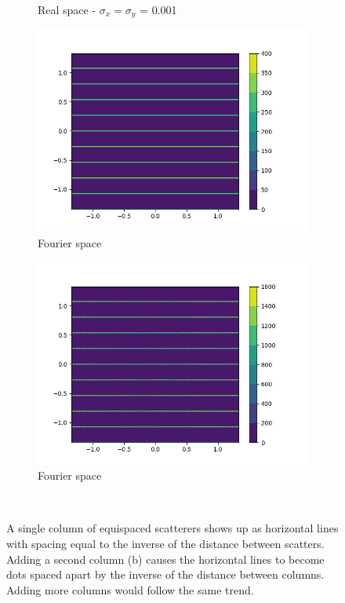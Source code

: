 \documentclass{article}
\begin{document}
\begin{figure}
\begin{subfigure}{0.45\textwidth}
                \caption{Real space - $\sigma_x=\sigma_y$ = 0.001}\label{fig:real_2d_2column}
        \end{subfigure}
	\begin{subfigure}{0.45\textwidth}
                \centering
                \includegraphics[width=\textwidth]{fourier_2d_1column.png}
                \caption{Fourier space}\label{fig:fourier_2d_1column}
	\end{subfigure}
        \begin{subfigure}{0.45\textwidth}
                \centering
                \includegraphics[width=\textwidth]{fourier_2d_2column.png}
                \caption{Fourier space}\label{fourier_2d_2column}
        \end{subfigure}
	\caption{A single column of equispaced scatterers shows up as horizontal lines
		 with spacing equal to the inverse of the distance between scatters. Adding
		 a second column (b) causes the horizontal lines to become dots spaced apart
		 by the inverse of the distance between columns. Adding more columns would
                 follow the same trend.}~\label{fig:2d_columns_simple}
\end{figure}
\end{document}
